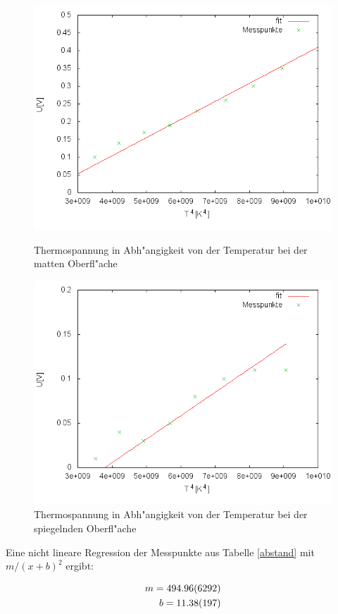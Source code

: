 	\begin{figure}[htbp]
		\centering
		\includegraphics[width = 12cm]{img/matt.png}
		\caption{Thermospannung in Abh"angigkeit von der Temperatur bei der matten Oberfl"ache}
		\label{matt_graph}

		\centering
		\includegraphics[width = 12cm]{img/spiegel.png}
		\caption{Thermospannung in Abh"angigkeit von der Temperatur bei der spiegelnden Oberfl"ache}
		\label{spiegel_graph}
	\end{figure}

	
	
	
	

	Eine nicht lineare Regression der Messpunkte aus Tabelle \eqref{abstand} mit $m/(x+b)^2$ ergibt:

	\begin{eqnarray*}
		m = \SI{494.96 (6292)}{}\\
		b = \SI{11.38 (197)}{}
	\end{eqnarray*}

